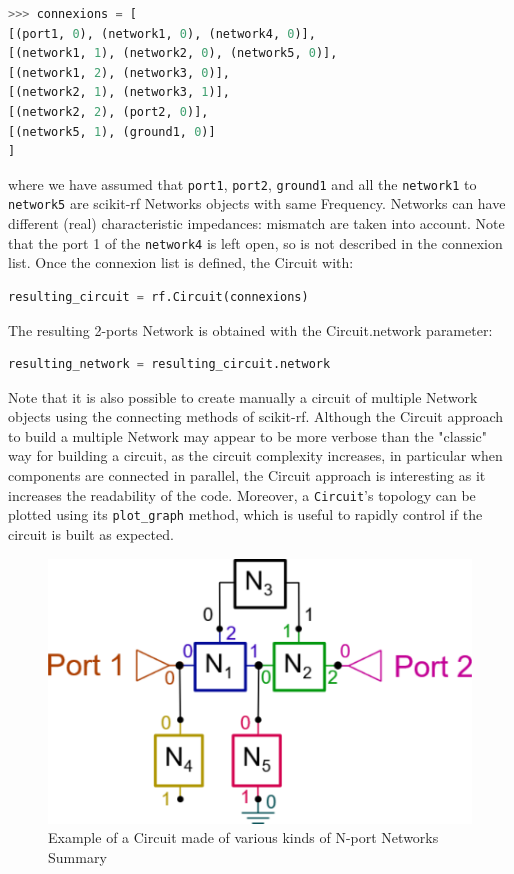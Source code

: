 \documentclass{IEEEjmw}
\begin{document}
\begin{lstlisting}[language=Python]
>>> connexions = [
[(port1, 0), (network1, 0), (network4, 0)],
[(network1, 1), (network2, 0), (network5, 0)],
[(network1, 2), (network3, 0)],
[(network2, 1), (network3, 1)],
[(network2, 2), (port2, 0)],
[(network5, 1), (ground1, 0)]
]
\end{lstlisting}

where we have assumed that \texttt{port1}, \texttt{port2}, \texttt{ground1} and all the \texttt{network1} to \texttt{network5} are scikit-rf Networks objects with same Frequency. Networks can have different (real) characteristic impedances: mismatch are taken into account. Note that the port 1 of the \texttt{network4} is left open, so is not described in the connexion list. Once the connexion list is defined, the Circuit with:

\begin{lstlisting}[language=Python]
resulting_circuit = rf.Circuit(connexions)
\end{lstlisting}

The resulting 2-ports Network is obtained with the Circuit.network parameter:
\begin{lstlisting}[language=Python]
resulting_network = resulting_circuit.network
\end{lstlisting}

Note that it is also possible to create manually a circuit of multiple Network objects using the connecting methods of scikit-rf. Although the Circuit approach to build a multiple Network may appear to be more verbose than the "classic" way for building a circuit, as the circuit complexity increases, in particular when components are connected in parallel, the Circuit approach is interesting as it increases the readability of the code. Moreover, a \texttt{Circuit}'s topology can be plotted using its \texttt{plot\_graph} method, which is useful to rapidly control if the circuit is built as expected.

\begin{figure}
	\centering
	\includegraphics[width=0.95\linewidth]{figures/circuit}
	\caption{ Example of a Circuit made of various kinds of N-port Networks
		Summary}
	\label{fig:circuit}
\end{figure}
\end{document}
